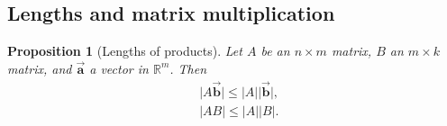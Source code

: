 \documentclass[12pt]{article}
\newtheorem{proposition}{Proposition}[section]
\theoremstyle{remark}
\let\oldvec = \vec
\renewcommand{\vec}[1]{\oldvec{\mathbf{#1}}}
\numberwithin{equation}{section}
\begin{document}
\subsection{Lengths and matrix multiplication}%
\label{sub:Lengths and matrix multiplication}

\begin{proposition}[Lengths of products]
	Let $ A $ be an $ n \times m $ matrix, $ B $ an $ m \times k $ matrix, and $ \vec{a} $ a vector in $ \mathbb{R}^{m} $. Then
	\begin{align}
	    & \lvert A \vec{b} \rvert \leq \lvert A \rvert \lvert \vec{b} \rvert, \\
	    & \lvert AB \rvert \leq \lvert A \rvert \lvert B \rvert.
	\end{align}
	
\end{proposition}




\end{document}

